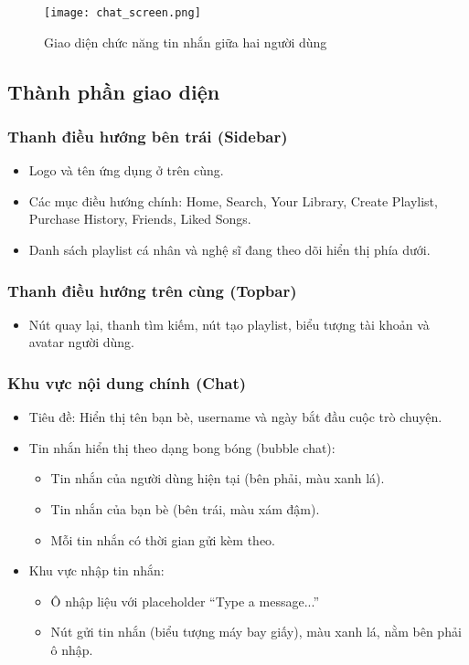 \documentclass{book}
\begin{document}
\begin{figure}[h!]
\centering
\texttt{[image: chat\_screen.png]}
\caption{Giao diện chức năng tin nhắn giữa hai người dùng}
\label{fig:chat}
\end{figure}

\subsection{Thành phần giao diện}

\subsubsection{Thanh điều hướng bên trái (Sidebar)}
\begin{itemize}
    \item Logo và tên ứng dụng ở trên cùng.
    \item Các mục điều hướng chính: Home, Search, Your Library, Create Playlist, Purchase History, Friends, Liked Songs.
    \item Danh sách playlist cá nhân và nghệ sĩ đang theo dõi hiển thị phía dưới.
\end{itemize}

\subsubsection{Thanh điều hướng trên cùng (Topbar)}
\begin{itemize}
    \item Nút quay lại, thanh tìm kiếm, nút tạo playlist, biểu tượng tài khoản và avatar người dùng.
\end{itemize}

\subsubsection{Khu vực nội dung chính (Chat)}
\begin{itemize}
    \item Tiêu đề: Hiển thị tên bạn bè, username và ngày bắt đầu cuộc trò chuyện.
    \item Tin nhắn hiển thị theo dạng bong bóng (bubble chat):
    \begin{itemize}
        \item Tin nhắn của người dùng hiện tại (bên phải, màu xanh lá).
        \item Tin nhắn của bạn bè (bên trái, màu xám đậm).
        \item Mỗi tin nhắn có thời gian gửi kèm theo.
    \end{itemize}
    \item Khu vực nhập tin nhắn:
    \begin{itemize}
        \item Ô nhập liệu với placeholder “Type a message...”
        \item Nút gửi tin nhắn (biểu tượng máy bay giấy), màu xanh lá, nằm bên phải ô nhập.
    \end{itemize}
\end{itemize}
\end{document}
